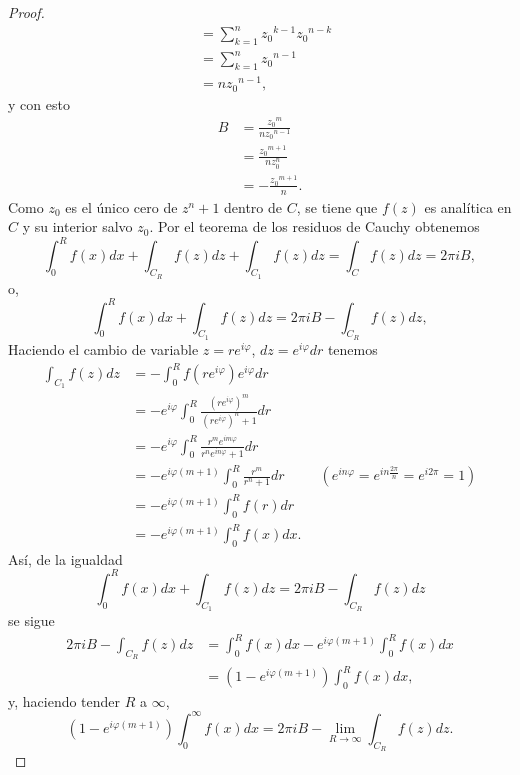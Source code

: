 \begin{proof}
$$\begin{aligned}
                                                            &=\sum_{k=1}^{n}{z_0}^{k-1}{z_0}^{n-k}\\
                                                            &=\sum_{k=1}^{n}{z_0}^{n-1}\\
                                                            &=n{z_0}^{n-1},
   \end{aligned}
   $$
   y con esto
   $$
   \begin{aligned}
      B&=\frac{{z_0}^m}{n{z_0}^{n-1}}\\
       &=\frac{{z_0}^{m+1}}{n{z_0^n}}\\
       &=-\frac{{z_0}^{m+1}}{n}.
   \end{aligned}
   $$
   Como $z_0$ es el único cero de $z^n+1$ dentro de $C$, se tiene que $f(z)$ es analítica en $C$ y su interior salvo $z_0$. Por el teorema de los residuos de Cauchy obtenemos
   $$
   \int_{0}^{R}f(x)dx+\int_{C_R}f(z)dz+\int_{C_1}f(z)dz=\int_{C}f(z)dz=2\pi i B,
   $$
   o,
   $$
   \int_{0}^{R}f(x)dx+\int_{C_1}f(z)dz=2\pi i B-\int _{C_R}f(z)dz,
   $$
   Haciendo el cambio de variable $z=re^{i\varphi}$, $dz=e^{i\varphi} dr$ tenemos
   $$
   \begin{aligned}
      \int_{C_1}f(z)dz&=-\int_{0}^{R}f(re^{i\varphi})e^{i\varphi} dr\\
                      &=-e^{i\varphi}\int_{0}^{R}\frac{(re^{i\varphi})^m}{(re^{i\varphi})^n+1}dr\\
                      &=-e^{i\varphi}\int_{0}^{R}\frac{r^me^{im\varphi}}{r^ne^{in\varphi}+1}dr\\
                      &=-e^{i\varphi(m+1)}\int_{0}^{R}\frac{r^m}{r^n+1}dr\phantom{00000}(e^{in\varphi}=e^{in\frac{2\pi}{n}}=e^{i2\pi}=1)\\
                      &=-e^{i\varphi(m+1)}\int_{0}^{R}f(r)dr\\
                      &=-e^{i\varphi(m+1)}\int_{0}^{R}f(x)dx.
   \end{aligned}
   $$
   Así, de la igualdad
   $$
   \int_{0}^{R}f(x)dx+\int_{C_1}f(z)dz=2\pi i B-\int _{C_R}f(z)dz
   $$
   se sigue
   $$
   \begin{aligned}
      2\pi i B-\int_{C_R}f(z)dz&=\int_{0}^{R}f(x)dx-e^{i\varphi(m+1)}\int_0^{R}f(x)dx\\
                               &=\left( 1-e^{i\varphi(m+1)}\right)\int_{0}^{R}f(x)dx,
   \end{aligned}
   $$
   y, haciendo tender $R$ a $\infty$,
   $$
   \left( 1-e^{i\varphi(m+1)}\right)\int_{0}^{\infty}f(x)dx=2\pi i B-\lim_{R\to\infty}\int_{C_R}f(z)dz.
$$
\end{proof}
